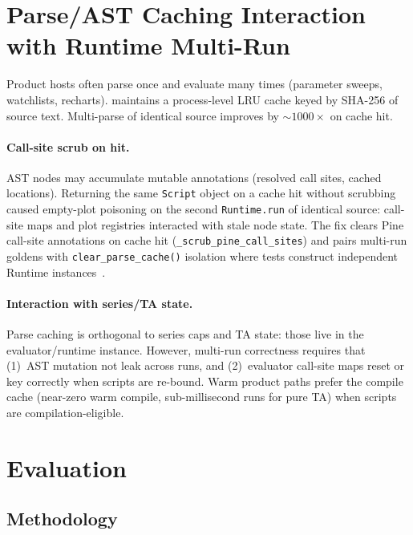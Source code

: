 \documentclass[11pt,a4paper]{article}
\begin{document}
\section{Parse/AST Caching Interaction with Runtime Multi-Run}
\label{sec:parse}

Product hosts often parse once and evaluate many times (parameter sweeps,
watchlists, recharts).  \pyne{} maintains a process-level LRU cache keyed by
SHA-256 of source text.  Multi-parse of identical source improves by
$\sim 1000\times$ on cache hit.

\paragraph{Call-site scrub on hit.}
AST nodes may accumulate mutable annotations (resolved call sites, cached
locations).  Returning the same \texttt{Script} object on a cache hit without
scrubbing caused empty-plot poisoning on the second \texttt{Runtime.run} of
identical source: call-site maps and plot registries interacted with stale
node state.  The fix clears Pine call-site annotations on cache hit
(\texttt{\_scrub\_pine\_call\_sites}) and pairs multi-run goldens with
\texttt{clear\_parse\_cache()} isolation where tests construct independent
Runtime instances~\citep{pynescript2026}.

\paragraph{Interaction with series/TA state.}
Parse caching is orthogonal to series caps and TA state: those live in the
evaluator/runtime instance.  However, multi-run correctness requires that
(1)~AST mutation not leak across runs, and (2)~evaluator call-site maps reset
or key correctly when scripts are re-bound.  Warm product paths prefer the
compile cache (near-zero warm compile, sub-millisecond runs for pure TA) when
scripts are compilation-eligible.

\section{Evaluation}
\label{sec:eval}

\subsection{Methodology}
\end{document}
